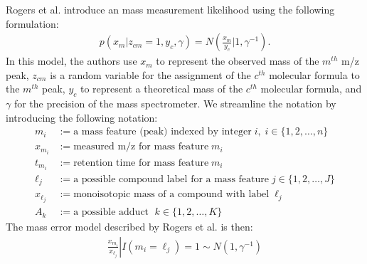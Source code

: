 \begin{DoubleSpace*}
Rogers et al. introduce an mass measurement likelihood using the following formulation:
\begin{align}
	p(x_m|z_{cm}=1,y_c,\gamma)=N\left(\frac{x_m}{y_c}|1,\gamma^{-1} \right).
\end{align}
In this model, the authors use $x_m$ to represent the observed mass of the $m^{th}$ m/z peak, $z_{cm}$ is a random variable for the assignment of the $c^{th}$ molecular formula to the $m^{th}$ peak, $y_c$ to represent a theoretical mass of the $c^{th}$ molecular formula, and $\gamma$ for the precision of the mass spectrometer. We streamline the notation by introducing the following notation:
\begin{align*}
m_i &:=\text{a mass feature (peak) indexed by integer}\; i, \; i \in \{1,2,\hdots,n \} \\
x_{m_i} &:= \text{measured m/z for mass feature}\; m_i \\
t_{m_i} &:= \text{retention time for mass feature}\; m_i \\
\ell_j &:= \text{a possible compound label for a mass feature}\; j\in\{1, 2, \hdots, J\} \\
x_{\ell_j} &:= \text{monoisotopic mass of a compound with label}\; \ell_j \\
A_k &:= \text{a possible adduct } \; k\in\{1, 2, \hdots, K\}
\end{align*} 
The mass error model described by Rogers et al. is then:
\begin{align}
	\left. \frac{x_{m_i}}{x_{\ell_j}} \right| I(m_i=\ell_j )=1 \sim N\left(1, \gamma^{-1}\right) 
\end{align}

\end{DoubleSpace*}